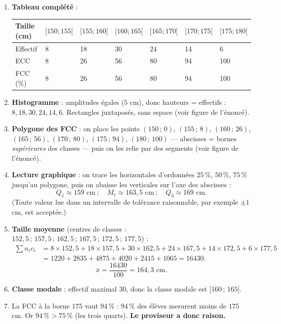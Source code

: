 \documentclass[11pt]{article}
\begin{document}
\begin{corrige}
\begin{enumerate}
    \item \textbf{Tableau complété} :
    \begin{center}
    \begin{tabularx}{\linewidth}{|l|X|X|X|X|X|X|}
    \hline
    \rowcolor{popblueL}
    Taille (cm) & $[150;155[$ & $[155;160[$ & $[160;165[$ & $[165;170[$ & $[170;175[$ & $[175;180[$ \\
    \hline
    Effectif & 8 & 18 & 30 & 24 & 14 & 6 \\
    \hline
    ECC & 8 & 26 & 56 & 80 & 94 & 100 \\
    \hline
    FCC (\%) & 8 & 26 & 56 & 80 & 94 & 100 \\
    \hline
    \end{tabularx}
    \end{center}
    \item \textbf{Histogramme} : amplitudes égales ($5$ cm), donc hauteurs = effectifs : $8, 18, 30, 24, 14, 6$. Rectangles juxtaposés, sans espace (voir figure de l'énoncé).
    \item \textbf{Polygone des FCC} : on place les points $(150\,;\,0)$, $(155\,;\,8)$, $(160\,;\,26)$, $(165\,;\,56)$, $(170\,;\,80)$, $(175\,;\,94)$, $(180\,;\,100)$ — abscisses = bornes \emph{supérieures} des classes — puis on les relie par des segments (voir figure de l'énoncé).
    \item \textbf{Lecture graphique} : on trace les horizontales d'ordonnées $25\,\%$, $50\,\%$, $75\,\%$ jusqu'au polygone, puis on abaisse les verticales sur l'axe des abscisses :
    \[ Q_1 \approx 159\text{ cm}\ ;\quad M_e \approx 163{,}5\text{ cm}\ ;\quad Q_3 \approx 169\text{ cm}. \]
    (Toute valeur lue dans un intervalle de tolérance raisonnable, par exemple $\pm 1$ cm, est acceptée.)
    \item \textbf{Taille moyenne} (centres de classes : $152{,}5\,;\,157{,}5\,;\,162{,}5\,;\,167{,}5\,;\,172{,}5\,;\,177{,}5$) :
    \begin{align*}
    \sum n_i c_i &= 8\times 152{,}5+18\times 157{,}5+30\times 162{,}5+24\times 167{,}5+14\times 172{,}5+6\times 177{,}5\\
    &= 1220+2835+4875+4020+2415+1065 = 16430.
    \end{align*}
    \[ \bar{x}=\frac{16430}{100}=\boxed{164{,}3\text{ cm}}. \]
    \item \textbf{Classe modale} : effectif maximal $30$, donc la classe modale est $\boxed{[160\,;\,165[}$.
    \item La FCC à la borne $175$ vaut $94\,\%$ : $94\,\%$ des élèves mesurent moins de $175$ cm. Or $94\,\% > 75\,\%$ (les trois quarts). \textbf{Le proviseur a donc raison.}
\end{enumerate}


\end{corrige}
\end{document}
